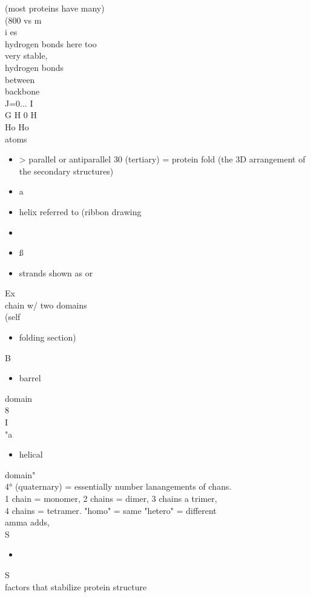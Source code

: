 \documentclass{article}
\begin{document}
(most proteins have many)\\
(800 vs m\\
i es\\
hydrogen bonds here too\\
very stable,\\
hydrogen bonds\\
between\\
backbone\\
J=0... I\\
G H 0 H\\
Ho Ho\\
atoms\\
\begin{itemize}\item > parallel or antiparallel
30 (tertiary) = protein fold (the 3D arrangement of the secondary structures)
\item  a\item helix referred to (ribbon drawing
\item \item ß\item strands shown as or
\end{itemize}
Ex\\
chain w/ two domains\\
(self\begin{itemize}\item folding section)
\end{itemize}
B\begin{itemize}\item barrel
\end{itemize}
domain\\
8\\
I\\
"a\begin{itemize}\item helical
\end{itemize}
domain"\\
4° (quaternary) = essentially number lanangements of chans.\\
1 chain = monomer, 2 chains = dimer, 3 chains a trimer,\\
4 chains = tetramer. "homo" = same "hetero" = different\\
amma adds,\\
S \begin{itemize}\item 
\end{itemize}
S\\
factors that stabilize protein structure\\
\end{document}

